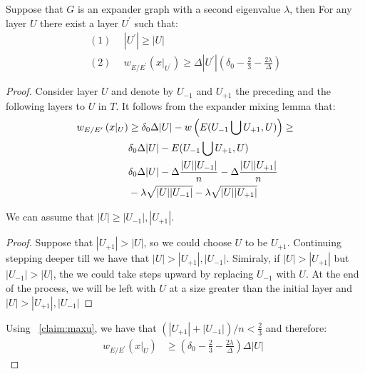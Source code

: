 
\begin{claim} \label{claim:flu1}  Suppose that $G$ is an expander graph with a second eigenvalue $\lambda$, then For any layer $U$ there exist a layer $U^{\prime}$ such that:
  \begin{equation*}
    \begin{split}
      (1) & \ \ |U^{\prime}| \ge |U| \\
      (2) & \ \ w_{E/E^{\prime}}\left( x|_{U^{\prime}} \right)  \ge\Delta|U^{\prime}|\left( \delta_{0}-\frac{2}{3}-\frac{2\lambda}{\Delta} \right)
    \end{split}
  \end{equation*}
\end{claim} 
  \begin{proof} Consider layer $U$ and denote by $U_{-1}$ and $U_{+1}$ the preceding and the following layers to $U$ in $T$. It follows from the expander mixing lemma that:
  \begin{equation*}
    \begin{split}
      w_{E/E^{\prime}}\left( x|_{U} \right) & \ge \delta_{0}\Delta|U| -w\left( E(U_{-1} \bigcup U_{+1} ,U) \right) \ge \\ 
      & \delta_{0}\Delta|U| - E(U_{-1} \bigcup U_{+1} ,U) \\ 
      &  \delta_{0}\Delta|U| - \Delta\frac{|U||U_{-1}|}{n} - \Delta\frac{|U||U_{+1}|}{n} \\
      & -\lambda\sqrt{|U||U_{-1}|} - \lambda\sqrt{|U||U_{+1}|}
    \end{split}
  \end{equation*}

  \begin{claim} \label{claim:maxu} We can assume that $|U| \ge |U_{-1}|, |U_{+1}|$. \end{claim}
  \begin{proof} Suppose that $|U_{+1}| > |U|$, so we could choose $U$ to be $U_{+1}$. Continuing stepping deeper till we have that $|U| > |U_{+1}|, |U_{-1}|$. Simiraly, if $|U| > |U_{+1}|$ but $|U_{-1}| > |U|$, the we could take steps upward by replacing $U_{-1}$ with $U$. At the end of the process, we will be left with $U$ at a size greater than the initial layer and $|U| > |U_{+1}|, |U_{-1}|$ \end{proof}

  Using ~\cref{claim:maxu}, we have that $\left( |U_{+1}| + |U_{-1}| \right)/n <\frac{2}{3} $ and therefore:
  \begin{equation*}
    \begin{split}
      w_{E/E^{\prime}}\left( x|_{U} \right) & \ge \left( \delta_{0} - \frac{2}{3} - \frac{2\lambda}{\Delta} \right) \Delta |U| \ \   
    \end{split}
  \end{equation*}
\end{proof}
